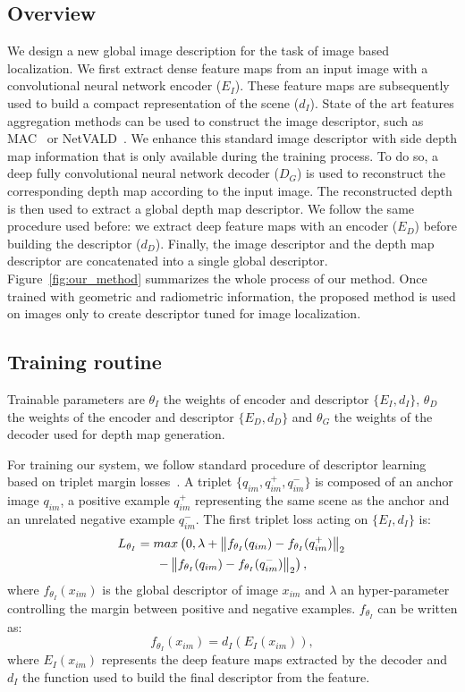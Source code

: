 \subsection{Overview}
\label{subsec:overview}
We design a new global image description for the task of image based localization. We first extract dense feature maps from an input image with a convolutional neural network encoder ($E_I$). These feature maps are subsequently used to build a compact representation of the scene ($d_I$). State of the art features aggregation methods can be used to construct the image descriptor, such as MAC~\cite{Radenovic2017} or NetVALD~\cite{Arandjelovic2017}. We enhance this standard image descriptor with side depth map information that is only available during the training process. To do so, a deep fully convolutional neural network decoder ($D_G$) is used to reconstruct the corresponding depth map according to the input image. The reconstructed depth is then used to extract a global depth map descriptor. We follow the same procedure used before: we extract deep feature maps with an encoder ($E_D$) before building the descriptor ($d_D$). Finally, the image descriptor and the depth map descriptor are concatenated into a single global descriptor. Figure~\ref{fig:our_method} summarizes the whole process of our method. Once trained with geometric and radiometric information, the proposed method is used on images only to create descriptor tuned for image localization.

\subsection{Training routine}
\label{subsec:training}
Trainable parameters are $\theta_{I}$ the weights of encoder and descriptor $\{E_I, d_I\}$, $\theta_{D}$ the weights of the encoder and descriptor $\{E_D, d_D\}$ and $\theta_{G}$ the weights of the decoder used for depth map generation. 

For training our system, we follow standard procedure of descriptor learning based on triplet margin losses~\cite{Arandjelovic2017}. A triplet $\{q_{im}, q_{im}^+, q_{im}^-\}$ is composed of an anchor image $q_{im}$, a positive example $q_{im}^+$ representing the same scene as the anchor and an unrelated negative example $q_{im}^-$.
The first triplet loss acting on $\{E_I, d_I\}$ is:
\begin{multline}
	\label{eq:triplet_loss}
	L_{\theta_{I}} = max\left(0, \lambda + \left\lVert f_{\theta_{I}}(q_{im}) - f_{\theta_{I}}(q_{im}^+)\right\rVert_2  \right. \\	
	\left. - \left\lVert f_{\theta_{I}}(q_{im}) - f_{\theta_{I}}(q_{im}^-)\right\rVert_2 \right),
\end{multline}
where $f_{\theta_{I}}(x_{im})$ is the global descriptor of image $x_{im}$ and $\lambda$ an hyper-parameter controlling the margin between positive and negative examples. $f_{\theta_{I}}$ can be written as:
\begin{equation}
	\label{eq:desc_details}
	f_{\theta_{I}}(x_{im}) = d_I(E_I(x_{im})),
\end{equation}
where $E_I(x_{im})$ represents the deep feature maps extracted by the decoder and $d_I$ the function used to build the final descriptor from the feature.

